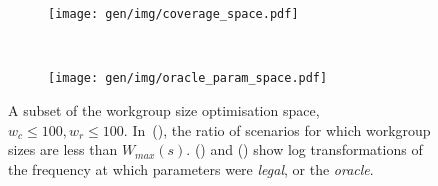 \begin{figure}
%
\begin{subfigure}[t]{0.98\textwidth}
\centering
\texttt{[image: gen/img/coverage\_space.pdf]}
\vspace{-1.5em} %
\caption{}
\label{fig:coverage}
\end{subfigure}
\\
\begin{subfigure}[t]{0.98\textwidth}
\centering
\texttt{[image: gen/img/oracle\_param\_space.pdf]}
\vspace{-1.5em} %
\caption{}
\label{fig:oracle-wgsizes}
\end{subfigure}
\caption{%
  A subset of the workgroup size optimisation space,
  $w_c \le 100, w_r \le 100$.  In~(), the
  ratio of scenarios for which workgroup sizes are less than
  $W_{max}(s)$. () and
  () show log transformations of the
  frequency at which parameters were \emph{legal}, or the
  \emph{oracle}.%
}
\label{fig:heatmaps}
\end{figure}


